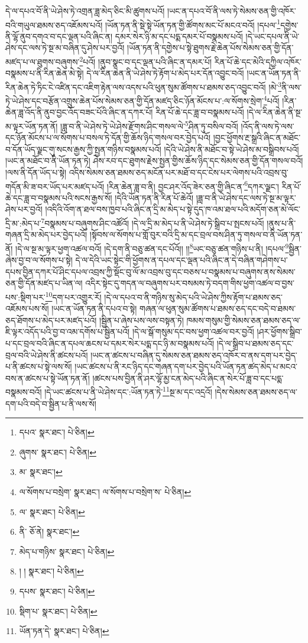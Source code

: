 དེ་ལ་དཔའ་བོ་ནི་ཡེ་ཤེས་ཏེ་འགྲན་ཟླ་མེད་ཅིང་མི་ཚུགས་པའོ། །ཡང་ན་དཔའ་བོ་ནི་ལས་ཏེ་སེམས་ཅན་གྱི་འཁོར་བའི་གཡུལ་ཐམས་ཅད་འཇོམས་པའོ། །ཡོན་ཏན་ནི་སྡེ་སྟེ་ཡོན་ཏན་གྱི་ཚོགས་མང་པོ་མངའ་བའོ། །དཔལ་\footnote{དཔའ་  སྣར་ཐང་།  པེ་ཅིན། }དགྱེས་ནི་ལྷོ་ནུབ་དགའ་བ་དང་ལྡན་པའི་ཞིང་ན། དམར་སེར་ཉི་མ་དང་པདྨ་དམར་པོ་བསྣམས་པའོ། །དེ་ཡང་དཔལ་ནི་ཡེ་ཤེས་དང་ལས་ཏེ་སྔ་མ་བཞིན་དུ་ཤེས་པར་བྱའོ། །ཡོན་ཏན་ནི་དགྱེས་པ་སྟེ་ཐུགས་རྗེ་ཆེན་པོས་སེམས་ཅན་གྱི་དོན་མཛད་པ་ལ་ཐུགས་བཞུགས་\footnote{ཞུགས་  སྣར་ཐང་།  པེ་ཅིན། }པའོ། །ནུབ་སྣང་བ་དང་ལྡན་པའི་ཞིང་ན་དམར་པོ། རིན་པོ་ཆེ་དང་མེའི་དཀྱིལ་འཁོར་བསྣམས་པ་ནི་རིན་ཆེན་མེ་སྟེ། དེ་ལ་རིན་ཆེན་ནི་ཡེ་ཤེས་ཏེ་རྟོག་པ་མེད་པར་དོན་འབྱུང་བའོ། །ཡང་ན་ཡོན་ཏན་ནི་རིན་ཆེན་ཏེ་ཏིང་ངེ་འཛིན་དང་འཇིག་རྟེན་ལས་འདས་པའི་ཕུན་སུམ་ཚོགས་པ་ཐམས་ཅད་འབྱུང་བའོ། །མེ་\footnote{མ་  སྣར་ཐང་། }ནི་ལས་ཏེ་ཡེ་ཤེས་དང་བརྩོན་འགྲུས་ཆེན་པོས་སེམས་ཅན་གྱི་དོན་མཛད་ཅིང་ཉོན་མོངས་པ་:ལ་སོགས་སྲེག་\footnote{ལ་སོགས་པ་བསྲེག་  སྣར་ཐང་། ལ་སོགས་པ་བསྲེག་ས་  པེ་ཅིན། }པའོ། །རིན་ཆེན་ཟླ་འོད་ནི་ནུབ་བྱང་འོད་བཟང་པོའི་ཞིང་ན་དཀར་པོ། རིན་པོ་ཆེ་དང་ཟླ་བ་བསྣམས་པའོ། །དེ་ལ་རིན་ཆེན་ནི་སྔ་མ་ལྟར་ཡོན་ཏན་ནོ། །ཟླ་བ་ནི་ཡེ་ཤེས་ཏེ་ཡེ་ཤེས་རྫོགས་ཤིང་གསལ་ལེ་\footnote{ལ་  སྣར་ཐང་།  པེ་ཅིན། }ཤིན་ཏུ་བསིལ་བའོ། །འོད་ནི་ལས་ཏེ་ལས་དང་ཉོན་མོངས་པ་ལ་སོགས་པ་བསལ་ཏེ་དོན་གྱི་ཆོས་ཉིད་གསལ་བར་བྱེད་པའོ། །བྱང་ཕྱོགས་རྔ་སྒྲའི་ཞིང་ན་མཐོང་བ་དོན་ཡོད་ལྗང་གུ་སངས་རྒྱས་ཀྱི་སྤྱན་གཉིས་བསྣམས་པའོ། །དེའི་ཡེ་ཤེས་ནི་མཐོང་བ་སྟེ་ཡེ་ཤེས་མ་བསྒྲིབས་པའོ། །ཡང་ན་མཐོང་བ་ནི་ཡོན་ཏན་ཏེ། ཤེས་རབ་དང་ཐུགས་རྗེས་སྤྱན་གྱིས་ཆོས་ཉིད་དང་སེམས་ཅན་གྱི་དོན་གསལ་བའོ། །ལས་ནི་དོན་ཡོད་པ་སྟེ། འདིས་སེམས་ཅན་ཐམས་ཅད་མངོན་པར་མཐོ་བ་དང་ངེས་པར་ལེགས་པའི་འབྲས་བུ་གདོན་མི་ཟ་བར་ཡོད་པར་མཛད་པའོ། །རིན་ཆེན་ཟླ་བ་ནི། བྱང་ཤར་འོད་ཟེར་ཅན་གྱི་ཞིང་ན་\footnote{ནི་  ཅོ་ནེ།  སྣར་ཐང་། }དཀར་ལྗང་། རིན་པོ་ཆེ་དང་ཟླ་བ་བསྣམས་པའི་སངས་རྒྱས་སོ། །དེའི་ཡོན་ཏན་ནི་རིན་པོ་ཆེའོ། །ཟླ་བ་ནི་ཡེ་ཤེས་དང་ལས་ཏེ་སྔ་མ་ལྟར་ཤེས་པར་བྱའོ། །འདིའི་འོག་ན་ཐལ་བས་ཁྱབ་པའི་ཞིང་ན་དྲི་མ་མེད་པ་སྟེ་དུད་ཁ་འམ་ཐལ་པའི་མདོག་ཅན་མེ་ལོང་དྲི་མ་:མེད་པ་\footnote{མེད་པ་གཉིས་  སྣར་ཐང་།  པེ་ཅིན། }བསྣམས་པ་བཞུགས་ཤིང་འཚོའོ། །དེ་ལ་དྲི་མ་མེད་པ་ནི་ཡེ་ཤེས་ཏེ་སྒྲིབ་པ་སྤངས་པའོ། །ནུས་པ་ནི་གཞན་དྲི་མ་མེད་པར་བྱེད་པའོ། །སྟོབས་ལ་སོགས་པ་གློ་བུར་བའི་དྲི་མ་དང་བྲལ་བས་ཤིན་ཏུ་གསལ་བ་ནི་ཡོན་ཏན་ནོ། །དེ་ལ་སྔ་མ་ལྟར་ཕྱག་འཚལ་བའོ། །དེ་དག་ནི་བཅུ་ཚན་དང་པོའོ།། །།\footnote{། །  སྣར་ཐང་།  པེ་ཅིན། }ཡང་བཅུ་ཚན་གཉིས་པ་ནི། །དཔལ་\footnote{དཔས་  སྣར་ཐང་།  པེ་ཅིན། }སྦྱིན་ཞེས་བྱ་བ་ལ་སོགས་པ་སྟེ། དེ་ལ་དེའི་ཡང་སྟེང་གི་ཕྱོགས་ན་དཔལ་དང་ལྡན་པའི་ཞིང་ན་དེ་བཞིན་གཤེགས་པ་དཔས་བྱིན་དཀར་པོ་ཤིང་དཔལ་འབྲས་ཀྱི་སྡོང་བུ་ལོ་མ་འབྲས་བུ་དང་བཅས་པ་བསྣམས་པ་བཞུགས་ནས་སེམས་ཅན་གྱི་དོན་མཛད་པ་ཡིན་ལ། འདིར་སྟེང་དུ་གདན་ལ་བཞུགས་པར་བསམས་ཏེ་བདག་གིས་ཕྱག་འཚལ་བ་བྱས་པས་:སྡིག་པར་\footnote{སྡིག་པ་  སྣར་ཐང་།  པེ་ཅིན། }དག་པར་འགྱུར་རོ། །དེ་ལ་དཔའ་བ་ནི་གཉིས་སུ་མེད་པའི་ཡེ་ཤེས་ཀྱིས་རྟོག་པ་ཐམས་ཅད་འཇོམས་པས་སོ། །ཡང་ན་ཡོན་ཏན་ནི་དཔའ་བ་སྟེ། གཞན་ལ་ཕུན་སུམ་ཚོགས་པ་ཐམས་ཅད་དང་བདེ་བ་ཐམས་ཅད་ཐོགས་པ་མེད་པར་མཛད་པའོ། །སྦྱིན་པ་ཞེས་པས་ལས་བསྟན་ཏེ། ཁམས་གསུམ་གྱི་སེམས་ཅན་ཐམས་ཅད་ལ་ཇི་ལྟར་འདོད་པའི་བྱ་བ་འམ་དགོས་པ་སྦྱིན་པའོ། །དེ་ལ་སྒོ་གསུམ་དང་བས་ཕྱག་འཚལ་བར་བྱའོ། །ཤར་ཕྱོགས་སྒྲིབ་པ་དང་བྲལ་བའི་ཞིང་ན་དཔལ་ཆངས་པ་དམར་སེར་པདྨ་དང་ཉི་མ་བསྣམས་པའོ། །དེ་ལ་སྒྲིབ་པ་ཐམས་ཅད་དང་བྲལ་བའི་ཡེ་ཤེས་ནི་ཚངས་པའོ། །ཡང་ན་ཚངས་པ་བཞིན་དུ་སེམས་ཅན་ཐམས་ཅད་འཁོར་བ་ནས་དག་པར་བྱེད་པ་ནི་ཚངས་པ་སྟེ་ལས་སོ། །ཡང་ཚངས་པ་ནི་རང་ཉིད་དང་གཞན་དག་པར་བྱེད་པའི་ཡོན་ཏན་ཚད་མེད་པ་མངའ་བས་ན་ཚངས་པ་སྟེ་ཡོན་ཏན་ནོ། །ཚངས་པས་བྱིན་ནི་ཤར་ལྷོ་མྱ་ངན་མེད་པའི་ཞིང་ན་སེར་པོ་ཟླ་བ་དང་པདྨ་བསྣམས་བའོ། །དེ་ཡང་ཚངས་པ་ནི་ཡེ་ཤེས་དང་:ཡོན་ཏན་ཏེ་\footnote{ཡོན་ཏན་དེ་  སྣར་ཐང་།  པེ་ཅིན། }སྔ་མ་དང་འདྲའོ། །དེས་སེམས་ཅན་ཐམས་ཅད་ལ་དག་པའི་བདེ་བ་སྦྱིན་པ་ནི་ལས་སོ། 